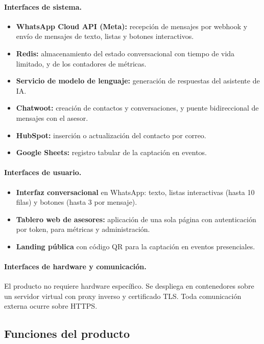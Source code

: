 \documentclass[12pt,a4paper]{report}
\begin{document}
\paragraph{Interfaces de sistema.}
\begin{itemize}[itemsep=2pt]
    \item \textbf{WhatsApp Cloud API (Meta):} recepción de mensajes por webhook y envío de mensajes
    de texto, listas y botones interactivos.
    \item \textbf{Redis:} almacenamiento del estado conversacional con tiempo de vida limitado, y de
    los contadores de métricas.
    \item \textbf{Servicio de modelo de lenguaje:} generación de respuestas del asistente de IA.
    \item \textbf{Chatwoot:} creación de contactos y conversaciones, y puente bidireccional de
    mensajes con el asesor.
    \item \textbf{HubSpot:} inserción o actualización del contacto por correo.
    \item \textbf{Google Sheets:} registro tabular de la captación en eventos.
\end{itemize}

\paragraph{Interfaces de usuario.}
\begin{itemize}[itemsep=2pt]
    \item \textbf{Interfaz conversacional} en WhatsApp: texto, listas interactivas (hasta 10 filas) y
    botones (hasta 3 por mensaje).
    \item \textbf{Tablero web de asesores:} aplicación de una sola página con autenticación por
    token, para métricas y administración.
    \item \textbf{Landing pública} con código QR para la captación en eventos presenciales.
\end{itemize}

\paragraph{Interfaces de hardware y comunicación.} El producto no requiere hardware específico. Se
despliega en contenedores sobre un servidor virtual con proxy inverso y certificado TLS. Toda
comunicación externa ocurre sobre HTTPS.

\subsection{Funciones del producto}
\end{document}
